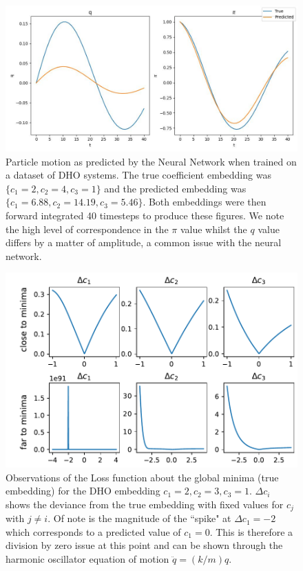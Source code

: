 \documentclass[10pt]{iopart}
\begin{document}
\begin{figure}
	\centering
	\label{model_comp}
	\includegraphics[width=\textwidth]{modelComp.jpg}
	\caption{Particle motion as predicted by the Neural Network when trained on a dataset of DHO systems. The true coefficient embedding was $\{c_1=2,c_2=4,c_3=1\}$ and the predicted embedding was$\{c_1=6.88,c_2=14.19,c_3=5.46\}$. Both embeddings were then forward integrated 40 timesteps to produce these figures. We note the high level of correspondence in the $\pi$ value whilst the $q$ value differs by a matter of amplitude, a common issue with the neural network.}
\end{figure}

\begin{figure}
	\centering
	\label{lossSlices}
	\includegraphics[width=\columnwidth]{loss-function-behaviour.pdf}
	\caption{Observations of the Loss function about the global minima (true embedding) for the DHO embedding ${c_1=2,c_2=3,c_3=1}$. $\Delta c_i$ shows the deviance from the true embedding with fixed values for $c_j$ with $j\neq i$. Of note is the magnitude of the ``spike" at $\Delta c_1 = -2$ which corresponds to a predicted value of $c_1 =0$. This is therefore a division by zero issue at this point and can be shown through the harmonic oscillator equation of motion $\ddot q = (k/m) q$.}
\end{figure}
\end{document}
